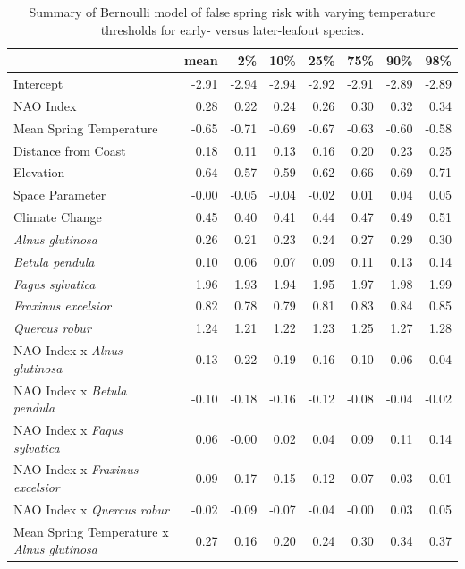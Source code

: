 \documentclass{article}\usepackage[]{graphicx}\usepackage[]{color}
\begin{document}
\newpage
\begin{longtable}{lrrrrrrr}
\caption{Summary of Bernoulli model of false spring risk with varying temperature thresholds for early- versus later-leafout species.} \\ 
  \hline
 & mean & 2\% & 10\% & 25\% & 75\% & 90\% & 98\% \\ 
  \hline \endhead  \hline
Intercept & -2.91 & -2.94 & -2.94 & -2.92 & -2.91 & -2.89 & -2.89 \\ 
  NAO Index & 0.28 & 0.22 & 0.24 & 0.26 & 0.30 & 0.32 & 0.34 \\ 
  Mean Spring 
Temperature & -0.65 & -0.71 & -0.69 & -0.67 & -0.63 & -0.60 & -0.58 \\ 
  Distance from 
Coast & 0.18 & 0.11 & 0.13 & 0.16 & 0.20 & 0.23 & 0.25 \\ 
  Elevation & 0.64 & 0.57 & 0.59 & 0.62 & 0.66 & 0.69 & 0.71 \\ 
  Space Parameter & -0.00 & -0.05 & -0.04 & -0.02 & 0.01 & 0.04 & 0.05 \\ 
  Climate Change & 0.45 & 0.40 & 0.41 & 0.44 & 0.47 & 0.49 & 0.51 \\ 
  \textit{Alnus glutinosa} & 0.26 & 0.21 & 0.23 & 0.24 & 0.27 & 0.29 & 0.30 \\ 
  \textit{Betula pendula} & 0.10 & 0.06 & 0.07 & 0.09 & 0.11 & 0.13 & 0.14 \\ 
  \textit{Fagus sylvatica} & 1.96 & 1.93 & 1.94 & 1.95 & 1.97 & 1.98 & 1.99 \\ 
  \textit{Fraxinus excelsior} & 0.82 & 0.78 & 0.79 & 0.81 & 0.83 & 0.84 & 0.85 \\ 
  \textit{Quercus robur} & 1.24 & 1.21 & 1.22 & 1.23 & 1.25 & 1.27 & 1.28 \\ 
  NAO Index
x\textit{ Alnus glutinosa} & -0.13 & -0.22 & -0.19 & -0.16 & -0.10 & -0.06 & -0.04 \\ 
  NAO Index
x\textit{ Betula pendula} & -0.10 & -0.18 & -0.16 & -0.12 & -0.08 & -0.04 & -0.02 \\ 
  NAO Index
x\textit{ Fagus sylvatica} & 0.06 & -0.00 & 0.02 & 0.04 & 0.09 & 0.11 & 0.14 \\ 
  NAO Index
x\textit{ Fraxinus excelsior} & -0.09 & -0.17 & -0.15 & -0.12 & -0.07 & -0.03 & -0.01 \\ 
  NAO Index
x\textit{ Quercus robur} & -0.02 & -0.09 & -0.07 & -0.04 & -0.00 & 0.03 & 0.05 \\ 
  Mean Spring 
Temperature
x\textit{ Alnus glutinosa} & 0.27 & 0.16 & 0.20 & 0.24 & 0.30 & 0.34 & 0.37 \\ 

\end{longtable}
\end{document}
